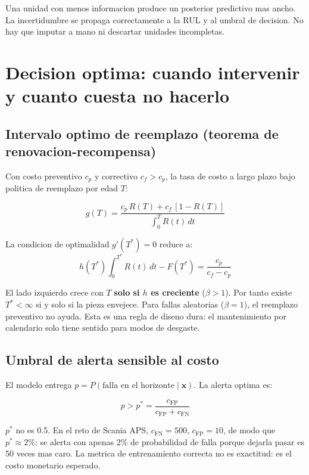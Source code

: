 \documentclass[10.5pt,a4paper]{article}
\begin{document}
Una unidad con menos informacion produce un posterior predictivo mas ancho. La incertidumbre se propaga correctamente a la RUL y al umbral de decision. No hay que imputar a mano ni descartar unidades incompletas.

\section{Decision optima: cuando intervenir y cuanto cuesta no hacerlo}

\subsection{Intervalo optimo de reemplazo (teorema de renovacion-recompensa)}

Con costo preventivo $c_p$ y correctivo $c_f > c_p$, la tasa de costo a largo plazo bajo politica de reemplazo por edad $T$:

\begin{mathbox}
$$g(T) = \frac{c_p\,R(T) + c_f\,[1-R(T)]}{\displaystyle\int_0^T R(t)\,dt}$$

La condicion de optimalidad $g'(T^*) = 0$ reduce a:
$$h(T^*)\int_0^{T^*} R(t)\,dt - F(T^*) = \frac{c_p}{c_f - c_p}$$

El lado izquierdo crece con $T$ \textbf{solo si $h$ es creciente} ($\beta > 1$). Por tanto existe $T^* < \infty$ si y solo si la pieza envejece. Para fallas aleatorias ($\beta = 1$), el reemplazo preventivo no ayuda. Esta es una regla de diseno dura: el mantenimiento por calendario solo tiene sentido para modos de desgaste.
\end{mathbox}

\subsection{Umbral de alerta sensible al costo}

El modelo entrega $p = P(\text{falla en el horizonte} \mid \mathbf{x})$. La alerta optima es:
\begin{mathbox}
$$p > p^* = \frac{c_{\mathrm{FP}}}{c_{\mathrm{FP}} + c_{\mathrm{FN}}}$$

$p^*$ no es 0.5. En el reto de Scania APS, $c_{\mathrm{FN}} = 500$, $c_{\mathrm{FP}} = 10$, de modo que $p^* \approx 2\%$: se alerta con apenas 2\% de probabilidad de falla porque dejarla pasar es 50 veces mas caro. La metrica de entrenamiento correcta no es exactitud: es el costo monetario esperado.
\end{mathbox}
\end{document}
